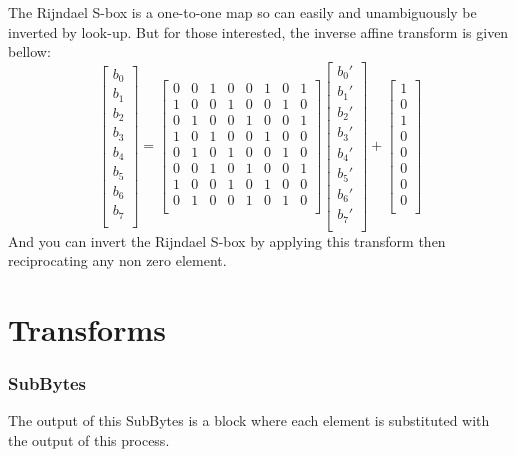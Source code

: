 The Rijndael S-box is a one-to-one map so can easily and unambiguously be inverted by look-up.
But for those interested,
the inverse affine transform is given bellow:
\[
\begin{bmatrix}
b_0\\ b_1\\ b_2\\ b_3\\ b_4\\ b_5\\ b_6\\ b_7\\
\end{bmatrix}
=
\begin{bmatrix}
	0&0&1&0&0&1&0&1\\
	1&0&0&1&0&0&1&0\\
	0&1&0&0&1&0&0&1\\
	1&0&1&0&0&1&0&0\\
	0&1&0&1&0&0&1&0\\
	0&0&1&0&1&0&0&1\\
	1&0&0&1&0&1&0&0\\
	0&1&0&0&1&0&1&0\\
\end{bmatrix}
\begin{bmatrix}
b_0'\\ b_1'\\ b_2'\\ b_3'\\ b_4'\\ b_5'\\ b_6'\\ b_7'\\
\end{bmatrix}
+
\begin{bmatrix}
1\\0\\1\\0\\0\\0\\0\\0\\
\end{bmatrix}
\]
And you can invert the Rijndael S-box by applying this transform then reciprocating any non zero element.

\section{Transforms}
\subsubsection{SubBytes}
The output of this SubBytes is a block where each element is substituted with the output of this process.


